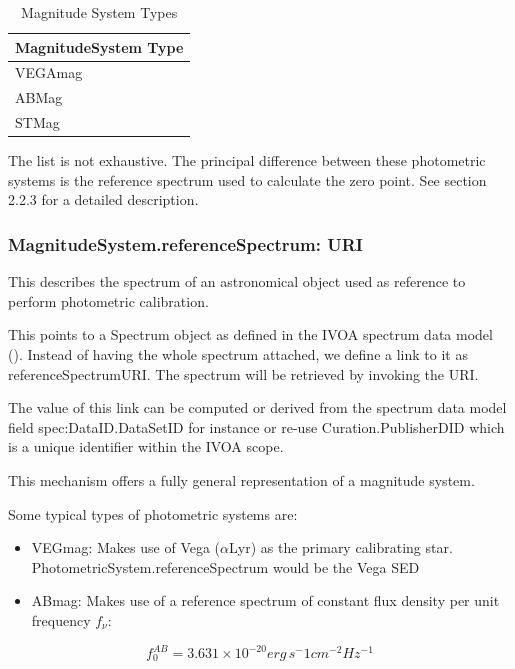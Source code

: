 \documentclass[11pt,a4paper]{ivoa}
\begin{document}


\begin{table}[H]
 			\centering
\begin{tabular}{p{2.42in}}
\hline
MagnitudeSystem Type \\
\hline
VEGAmag \\
\hline
ABMag \\
\hline
STMag \\
\hline
\end{tabular}
\caption{Magnitude System Types}
 \end{table}



The list is not exhaustive. The principal difference between these 
photometric systems is the reference spectrum used to calculate the 
zero point. See section 2.2.3 for a detailed description.
\par

\subsubsection{MagnitudeSystem.referenceSpectrum: URI}
This describes the spectrum of an astronomical object used as 
reference to perform photometric calibration.
\par

This points to a Spectrum object as defined in the IVOA spectrum data 
model (\citep{mcdowell2012ivoa}). Instead of having the whole spectrum 
attached, we define a link to it as referenceSpectrumURI. 
The spectrum will be retrieved by invoking the URI.
\par

The value of this link can be computed or derived from the spectrum 
data model field spec:DataID.DataSetID for instance or re-use Curation.PublisherDID 
which is a unique identifier within the IVOA scope.
\par

This mechanism offers a fully general representation of a magnitude 
system.\par

Some typical types of photometric systems are:
\par

\begin{itemize}
	\item{VEGmag: Makes use of Vega ($\alpha $Lyr) as the primary calibrating 
	star. PhotometricSystem.referenceSpectrum would be the Vega SED\par}

	\item{ABmag: Makes use of a reference spectrum of constant flux 
	density per unit frequency $f_\nu $:}
\end{itemize}
\begin{equation} \label{eq:31}
f_0^{AB} = 3.631 \times 10^{-20} erg\, s^-1 cm^{-2} Hz^{-1}
\end{equation}
\end{document}
